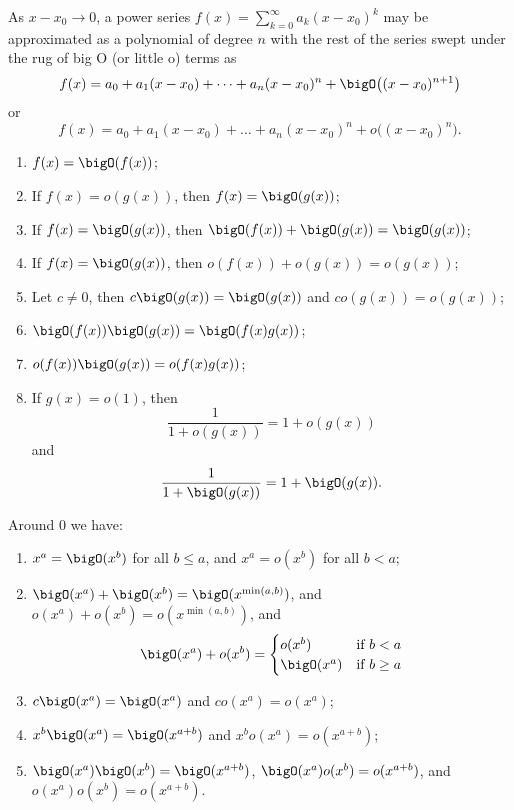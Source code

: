 \begin{example}
As $x-x_{0}\to 0$, a power series $f(x)=\sum^{\infty}_{k=0}a_{k}(x-x_{0})^{k}$
may be approximated as a polynomial of degree $n$ with the rest of the
series swept under the rug of big O (or little o) terms as
\[f(x) = a_{0} + a_{1}(x-x_{0}) + \dots + a_{n}(x-x_{0})^{n} + \bigO\bigl((x-x_{0})^{n+1}\bigr)\]
or
\[f(x) = a_{0} + a_{1}(x-x_{0}) + \dots + a_{n}(x-x_{0})^{n} + o\bigl((x-x_{0})^{n}\bigr).\]
\end{example}

\begin{theorem}\label{calculus-0004}%
\begin{enumerate}
\item $f(x)=\bigO(f(x))$;
\item If $f(x)=o(g(x))$, then $f(x)=\bigO(g(x))$;
\item If $f(x)=\bigO(g(x))$, then $\bigO(f(x))+\bigO(g(x))=\bigO(g(x))$;
\item If $f(x)=\bigO(g(x))$, then $o(f(x))+o(g(x))=o(g(x))$;
\item Let $c\neq0$, then $c\bigO(g(x))=\bigO(g(x))$ and $co(g(x))=o(g(x))$;
\item $\bigO(f(x))\bigO(g(x))=\bigO(f(x)g(x))$;
\item $o(f(x))\bigO(g(x))=o(f(x)g(x))$;
\item If $g(x)=o(1)$, then
  \[\frac{1}{1+o(g(x))}=1+o(g(x))\]
  and
  \[\frac{1}{1+\bigO(g(x))}=1+\bigO(g(x)).\]
\end{enumerate}
\end{theorem}

\begin{theorem}\label{calculus-0003}%
Around $0$ we have:
\begin{enumerate}
\item $x^{a}=\bigO(x^{b})$ for all $b\leq a$, and $x^{a}=o(x^{b})$ for
  all $b<a$;
\item $\bigO(x^{a})+\bigO(x^{b})=\bigO(x^{\min(a,b)})$,
  and $o(x^{a})+o(x^{b})=o(x^{\min(a,b)})$, and
\[\bigO(x^{a})+o(x^{b}) = \begin{cases}o(x^{b}) & \mbox{if }b<a\\
\bigO(x^{a}) & \mbox{if }b\geq a \end{cases}\]
\item $c\bigO(x^{a}) = \bigO(x^{a})$ and $c o(x^{a})=o(x^{a})$;
\item $x^{b}\bigO(x^{a}) = \bigO(x^{a+b})$ and
  $x^{b} o(x^{a})=o(x^{a+b})$;
\item $\bigO(x^{a})\bigO(x^{b}) = \bigO(x^{a+b})$,
  $\bigO(x^{a})o(x^{b}) = o(x^{a+b})$, and
  $o(x^{a})o(x^{b})=o(x^{a+b})$.
\end{enumerate}
\end{theorem}


